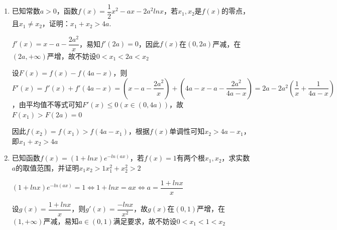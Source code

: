 \begin{enumerate}
\begin{enumerate}
\begin{jieda}
            由 $2 - {x}_{2} < 1$ ，且函数 $f\left( x\right)$ 在 $x \in  \left( {-\infty ,1}\right)$ 单调递减，得 ${x}_{1} < 2 - {x}_{2}$ ，即 ${x}_{1} + {x}_{2} < 2$ ， $D$ 正确.
            
            又 $0 < {x}_{1} < 1 < {x}_{2} < {x}_{0} < 2$ ,则 $2 > {x}_{1} + {x}_{2} > 2\sqrt{{x}_{1}{x}_{2}}$ ,即 $1 > \sqrt{{x}_{1}{x}_{2}}$ ,故 $0 < {x}_{1}{x}_{2} < 1,{C}$ 错误.

            \ps 数形结合，判断出极值点右偏可以快速选出答案.
        \end{jieda}
        \item 已知常数$a > 0$，函数$f(x) = \dfrac{1}{2}x^2-ax-2a^2lnx$，若$x_1, x_2$是$f(x)$的零点，且$x_1 \neq x_2$，证明：$x_1+x_2>4a$.
        \begin{jieda}
            $f'(x) = x-a-\dfrac{2a^2}{x}$，易知$f'(2a) = 0$，因此$f(x)$在$(0, 2a)$严减，在$(2a, +\infty)$严增，故不妨设$0 < x_1 < 2a < x_2$

            设$F(x) = f(x) - f(4a-x)$，则$F'(x) = f'(x) + f'(4a-x) = \left(x-a-\dfrac{2a^2}{x}\right)+\left(4a-x-a-\dfrac{2a^2}{4a-x}\right) = 2a - 2a^2\left(\dfrac{1}{x} + \dfrac{1}{4a-x}\right)$，由平均值不等式可知$F'(x) \leq 0 (x \in (0, 4a))$，故$F(x_1) > F(2a) = 0$

            因此$f(x_2) = f(x_1) > f(4a-x_1)$，根据$f(x)$单调性可知$x_2 > 4a-x_1$，即$x_1+x_2 > 4a$
        \end{jieda}

        \item 已知函数$f(x) = (1+lnx)e^{-ln(ax)}$，若$f(x) = 1$有两个根$x_1, x_2$，求实数$a$的取值范围，并证明$x_1x_2>1$$x_1^2+x_2^2>2$
        \begin{jieda}
            $(1+lnx)e^{-ln(ax)} = 1 \Longleftrightarrow 1+lnx = ax \Longleftrightarrow a = \dfrac{1+lnx}{x}$

            设$g(x) = \dfrac{1+lnx}{x}$，则$g'(x) = \dfrac{-lnx}{x^2}$，故$g(x)$在$(0, 1)$严增，在$(1, +\infty)$严减，易知$a \in (0, 1)$满足要求，故不妨设$0 < x_1 < 1 < x_2$

\end{jieda}
\end{enumerate}
\end{enumerate}
